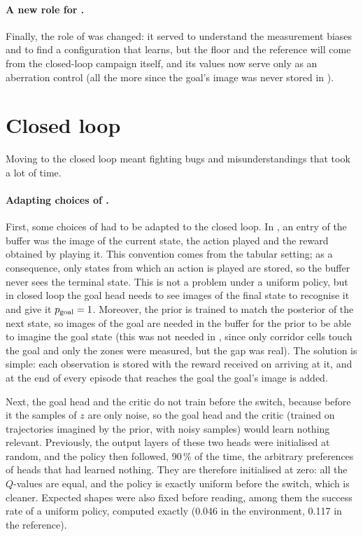 \documentclass[10pt]{article}
\begin{document}
\paragraph{A new role for \EThreeZero.}
Finally, the role of \EThreeZero{} was changed: it served to understand the measurement biases and to find a
configuration that learns, but the floor and the reference will come from the closed-loop campaign itself, and its values
now serve only as an aberration control (all the more since the goal's image was never stored in \EThreeZero).

\section{Closed loop}
\label{sec:closed}

Moving to the closed loop meant fighting bugs and misunderstandings that took a lot of time.

\paragraph{Adapting choices of \EThreeZero.}
First, some choices of \EThreeZero{} had to be adapted to the closed loop.
In \EThreeZero, an entry of the buffer was the image of the current state, the action played and the reward obtained by
playing it. This convention comes from the tabular setting; as a consequence, only states from which an action is played
are stored, so the buffer never sees the terminal state.
This is not a problem under a uniform policy, but in closed loop the goal head needs to see images of the final state to
recognise it and give it $p_{\mathrm{goal}} = 1$. %
Moreover, the prior is trained to match the posterior of the next state, so images of the goal are needed in the buffer
for the prior to be able to imagine the goal state (this was not needed in \EThreeZero, since only corridor cells touch
the goal and only the zones were measured, but the gap was real).
The solution is simple: each observation is stored with the reward received on arriving at it, and at the end of every
episode that reaches the goal the goal's image is added.

Next, the goal head and the critic do not train before the switch, because before it the samples of $z$ are only noise,
so the goal head and the critic (trained on trajectories imagined by the prior, with noisy samples) would learn nothing
relevant.
Previously, the output layers of these two heads were initialised at random, and the policy then followed, 90\,\% of %
the time, the arbitrary preferences of heads that had learned nothing.
They are therefore initialised at zero: all the $Q$-values are equal, and the policy is exactly uniform before the
switch, which is cleaner.
Expected shapes were also fixed before reading, among them the success rate of a uniform policy, computed exactly
(0.046 in the environment, 0.117 in the reference). %
\end{document}
